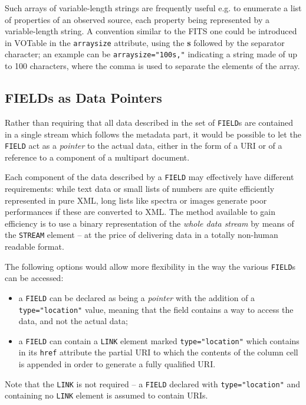 \documentclass[11pt,a4paper]{ivoa}
\let\fg=\color
\def\attr#1{{\tt{\fg{DarkRed}#1}}}
\def\elem#1{{\tt{\fg{DarkRed}#1}}}
\def\attrval#1#2{{\tt{\fg{DarkRed}#1}="{\fg{DarkPurple}#2}"}}
\begin{document}
{{{Such arrays of variable-length strings are frequently useful e.g.
to enumerate a list of properties of an observed source, each property being
represented by a variable-length string.
A convention similar to the FITS one could be introduced in
VOTable in the \attr{arraysize}
attribute, using the {\bf s} followed by the separator character;
an example can be \attrval{arraysize}{100s,}
indicating a string made of up to 100 characters, where the comma
is used to separate the elements of the array.

\subsection{FIELDs as Data Pointers}
\label{location}

Rather than requiring that all data described in the set of \elem{FIELD}s
are contained in a single stream which follows the metadata part,
it would be possible to let the \elem{FIELD} act as
a {\em pointer} to the actual data, either in the form of a URI or of
a reference to a component of a multipart document.

Each component of the data described by a \elem{FIELD} may effectively
have different requirements: while text data or small lists of numbers
are quite efficiently represented in pure XML, long lists like spectra
or images generate poor performances if these are converted to XML.
The method available to gain efficiency is to use a
binary representation of the {\em whole data stream} by means of the
\elem{STREAM} element -- at the price of delivering data in a totally non-human
readable format.

The following options would allow more flexibility in the way the
various \elem{FIELD}s can be accessed:

\begin{itemize}
\item   a \elem{FIELD} can be declared as being a {\em pointer}
        with the addition of a \attrval{type}{location} value,
        meaning that the field contains a way to access the data,
        and not the actual data;
\item   a \elem{FIELD} can contain a \elem{LINK} element marked
        \attrval{type}{location} which contains in its
        \attr{href} attribute the partial URI to which the contents
        of the column cell is appended in order to generate a
        fully qualified URI.
\end{itemize}
Note that the \elem{LINK} is not required -- a \elem{FIELD} declared
with \attrval{type}{location} and containing no \elem{LINK} element
is assumed to contain URIs.

}}}
\end{document}
